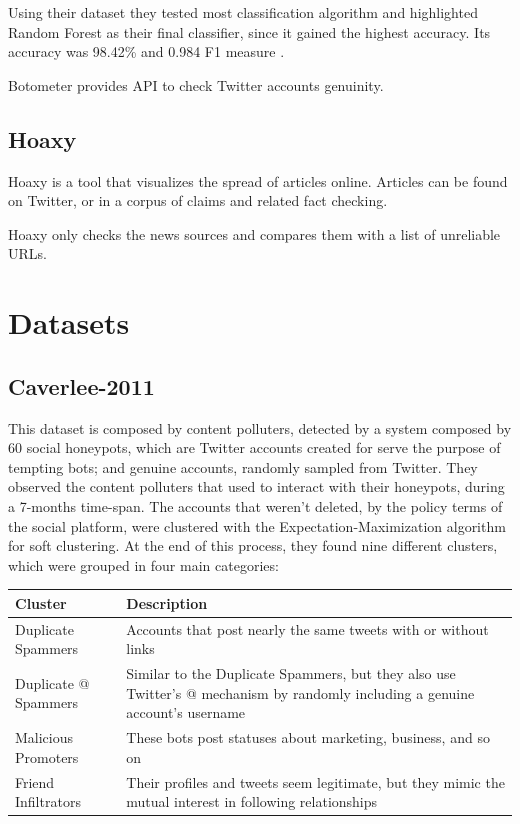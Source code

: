 Using their dataset they tested most classification algorithm and highlighted Random Forest as their final classifier, since it gained the highest accuracy. Its accuracy was 98.42\% and 0.984 F1 measure \cite{Lee11sevenmonths}.

Botometer provides API to check Twitter accounts genuinity.

\subsection{Hoaxy}
Hoaxy is a tool that visualizes the spread of articles online. Articles can be found on Twitter, or in a corpus of claims and related fact checking.

Hoaxy only checks the news sources and compares them with a list of unreliable URLs.

\section{Datasets}

\subsection{Caverlee-2011}
This dataset is composed by content polluters, detected by a system composed by 60 social honeypots, which are Twitter accounts created for serve the purpose of tempting bots; and genuine accounts, randomly sampled from Twitter.
They observed the content polluters that used to interact with their honeypots, during a 7-months time-span. The accounts that weren't deleted, by the policy terms of the social platform, were clustered with the Expectation-Maximization algorithm for soft clustering. At the end of this process, they found nine different clusters, which were grouped in four main categories:

\begin{center}
	\begin{tabular}{>{\raggedright\arraybackslash}m{5.5cm}|>{\raggedright\arraybackslash}m{5.5cm}}
		\\Cluster&Description\\
		\hline\hline
		Duplicate Spammers & Accounts that post nearly the same tweets with or without links\\\hline
		Duplicate @ Spammers & Similar to the Duplicate Spammers, but they also use Twitter’s @ mechanism by randomly including a genuine account’s username\\\hline
		Malicious Promoters & These bots post statuses about marketing, business, and so on\\\hline
		Friend Infiltrators & Their profiles and tweets seem legitimate, but they mimic the mutual interest in following relationships\\\hline
	\end{tabular}
\end{center}

